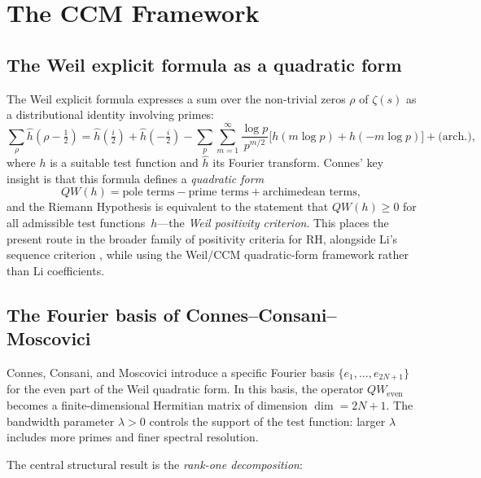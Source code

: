\documentclass[12pt,a4paper]{article}
\theoremstyle{definition}
\theoremstyle{remark}
\begin{document}
\section{The CCM Framework}
\label{sec:framework}

\subsection{The Weil explicit formula as a quadratic form}

The Weil explicit formula \cite{Weil1952} expresses a sum over the
non-trivial zeros $\rho$ of $\zeta(s)$ as a distributional identity
involving primes:
\begin{equation}
\label{eq:weil}
\sum_\rho \hat{h}(\rho - \tfrac{1}{2})
= \hat{h}(\tfrac{i}{2}) + \hat{h}(-\tfrac{i}{2})
- \sum_p \sum_{m=1}^\infty \frac{\log p}{p^{m/2}}
  \bigl[h(m\log p) + h(-m\log p)\bigr]
+ \text{(arch.)},
\end{equation}
where $h$ is a suitable test function and $\hat{h}$ its Fourier
transform.
Connes' key insight \cite{Connes1999} is that this formula defines
a \emph{quadratic form}
\begin{equation}
\label{eq:QW-def}
QW(h) = \text{pole terms} - \text{prime terms} + \text{archimedean terms},
\end{equation}
and the Riemann Hypothesis is equivalent to the statement that
$QW(h) \geq 0$ for all admissible test functions~$h$---the
\emph{Weil positivity criterion}.
This places the present route in the broader family of positivity
criteria for RH, alongside Li's sequence criterion \cite{Li1997}, while
using the Weil/CCM quadratic-form framework rather than Li coefficients.

\subsection{The Fourier basis of Connes--Consani--Moscovici}

Connes, Consani, and Moscovici \cite{CCM2025} introduce a specific
Fourier basis $\{e_1, \ldots, e_{2N+1}\}$ for the even part of the
Weil quadratic form.
In this basis, the operator $QW_{\mathrm{even}}$ becomes a
finite-dimensional Hermitian matrix of dimension $\dim = 2N+1$.
The bandwidth parameter $\lambda > 0$ controls the support of the
test function: larger $\lambda$ includes more primes and finer
spectral resolution.

The central structural result is the \emph{rank-one decomposition}:
\end{document}
